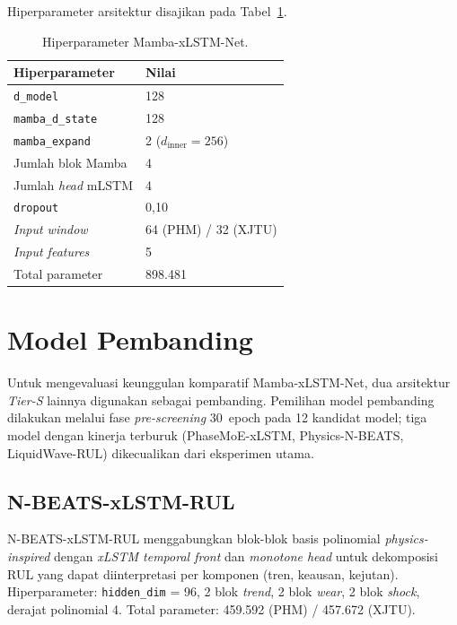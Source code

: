 Hiperparameter arsitektur disajikan pada Tabel~\ref{tab:bab4_hyperp_mamba}.

\begin{table}[ht]
\centering
\caption{Hiperparameter Mamba-xLSTM-Net.}
\label{tab:bab4_hyperp_mamba}
\small
\begin{tabular}{@{}ll@{}}
\toprule
\textbf{Hiperparameter} & \textbf{Nilai} \\
\midrule
\texttt{d\_model}          & 128    \\
\texttt{mamba\_d\_state}   & 128    \\
\texttt{mamba\_expand}     & 2 ($d_{\text{inner}} = 256$)    \\
Jumlah blok Mamba          & 4      \\
Jumlah \emph{head} mLSTM   & 4      \\
\texttt{dropout}           & 0{,}10 \\
\emph{Input window}        & 64 (PHM) / 32 (XJTU) \\
\emph{Input features}      & 5 \\
Total parameter            & 898.481 \\
\bottomrule
\end{tabular}
\end{table}

\section{Model Pembanding}
\label{sec:bab4_pembanding}

Untuk mengevaluasi keunggulan komparatif Mamba-xLSTM-Net, dua arsitektur
\emph{Tier-S} lainnya digunakan sebagai pembanding.
Pemilihan model pembanding dilakukan melalui fase \emph{pre-screening}
30~epoch pada 12 kandidat model; tiga model dengan kinerja terburuk
(PhaseMoE-xLSTM, Physics-N-BEATS, LiquidWave-RUL) dikecualikan dari
eksperimen utama.

\subsection{N-BEATS-xLSTM-RUL}
\label{subsec:bab4_nbeats}

N-BEATS-xLSTM-RUL menggabungkan blok-blok basis polinomial
\emph{physics-inspired} dengan \emph{xLSTM temporal front} dan
\emph{monotone head} untuk dekomposisi RUL yang dapat diinterpretasi
per komponen (tren, keausan, kejutan).
Hiperparameter: \texttt{hidden\_dim} = 96, 2 blok \emph{trend}, 2 blok
\emph{wear}, 2 blok \emph{shock}, derajat polinomial 4.
Total parameter: 459.592 (PHM) / 457.672 (XJTU).

